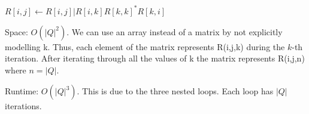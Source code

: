 \begin{enumerate}[(a)]
\begin{algorithm}[H]
\begin{algorithmic}
					\State $R[i,j] \gets R[i,j] | R[i, k]R[k,k]^{*}R[k,i]$
				\EndFor
			\EndFor
		\EndFor
	  \EndFunction
	\end{algorithmic}
\end{algorithm}

Space: $O(|Q|^2)$. We can use an array instead of a matrix by not explicitly modelling k.
Thus, each element of the matrix represents R(i,j,k) during the $k$-th iteration.
After iterating through all the values of k the matrix represents R(i,j,n) where $n=|Q|$.

Runtime: $O(|Q|^3)$. This is due to the three nested loops. Each loop has $|Q|$ iterations.

\end{enumerate}